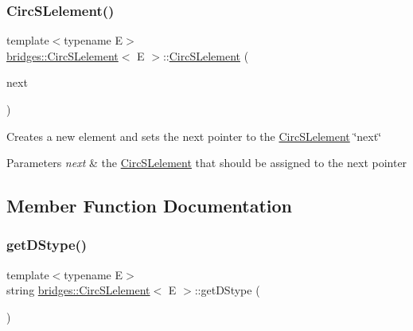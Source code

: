 \subsubsection{\texorpdfstring{Circ\+S\+Lelement()}{CircSLelement()}\hspace{0.1cm}{\footnotesize\ttfamily [4/4]}}
{\footnotesize\ttfamily template$<$typename E$>$ \\
\hyperlink{classbridges_1_1_circ_s_lelement}{bridges\+::\+Circ\+S\+Lelement}$<$ E $>$\+::\hyperlink{classbridges_1_1_circ_s_lelement}{Circ\+S\+Lelement} (\begin{DoxyParamCaption}\item[{\hyperlink{classbridges_1_1_circ_s_lelement}{Circ\+S\+Lelement}$<$ E $>$ $\ast$}]{next }\end{DoxyParamCaption})\hspace{0.3cm}{\ttfamily [inline]}}

Creates a new element and sets the next pointer to the \hyperlink{classbridges_1_1_circ_s_lelement}{Circ\+S\+Lelement} \char`\"{}next\char`\"{} 
\begin{DoxyParams}{Parameters}
{\em next} & the \hyperlink{classbridges_1_1_circ_s_lelement}{Circ\+S\+Lelement} that should be assigned to the next pointer \\
\hline
\end{DoxyParams}


\subsection{Member Function Documentation}
\hypertarget{classbridges_1_1_circ_s_lelement_adc203513015408e6f370138acf4815ed}{}\label{classbridges_1_1_circ_s_lelement_adc203513015408e6f370138acf4815ed} 
\subsubsection{\texorpdfstring{get\+D\+Stype()}{getDStype()}}
{\footnotesize\ttfamily template$<$typename E$>$ \\
string \hyperlink{classbridges_1_1_circ_s_lelement}{bridges\+::\+Circ\+S\+Lelement}$<$ E $>$\+::get\+D\+Stype (\begin{DoxyParamCaption}{ }\end{DoxyParamCaption})\hspace{0.3cm}{\ttfamily [inline]}}

